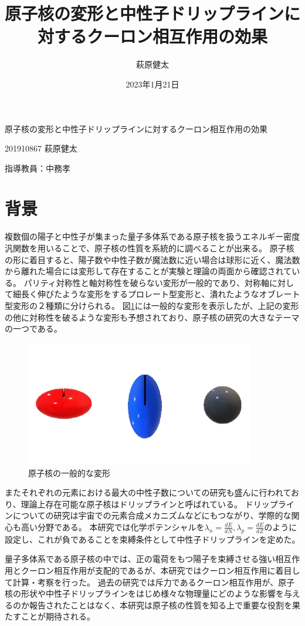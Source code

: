 \documentclass[12pt]{jarticle}
\title{原子核の変形と中性子ドリップラインに対するクーロン相互作用の効果}
\author{萩原健太}
\date{2023年1月21日}
\begin{document}
\begin{center}
    {\Large
        原子核の変形と中性子ドリップラインに対するクーロン相互作用の効果
    }
\end{center}
\vspace{1em}
\begin{flushright}
  201910867 萩原健太

  指導教員：中務孝
\end{flushright}


\section{背景}
複数個の陽子と中性子が集まった量子多体系である原子核を扱うエネルギー密度汎関数を用いることで、原子核の性質を系統的に調べることが出来る。
原子核の形に着目すると、陽子数や中性子数が魔法数に近い場合は球形に近く、魔法数から離れた場合には変形して存在することが実験と理論の両面から確認されている。
パリティ対称性と軸対称性を破らない変形が一般的であり、対称軸に対して細長く伸びたような変形をするプロレート型変形と、潰れたようなオブレート型変形の２種類に分けられる。
図\ref{fig:deformation}には一般的な変形を表示したが、上記の変形の他に対称性を破るような変形も予想されており、原子核の研究の大きなテーマの一つである。

\begin{figure}[H]
    \centering
    \includegraphics[width=100mm]{../変形図.png}
    \caption{原子核の一般的な変形}\label{fig:deformation}
\end{figure}

またそれぞれの元素における最大の中性子数についての研究も盛んに行われており、理論上存在可能な原子核はドリップラインと呼ばれている。
ドリップラインについての研究は宇宙での元素合成メカニズムなどにもつながり、学際的な関心も高い分野である。
本研究では化学ポテンシャルを$\lambda_n=\frac{dE}{dN}, \lambda_p=\frac{dE}{dZ}$のように設定し、これが負であることを束縛条件として中性子ドリップラインを定めた。

量子多体系である原子核の中では、正の電荷をもつ陽子を束縛させる強い相互作用とクーロン相互作用が支配的であるが、本研究ではクーロン相互作用に着目して計算・考察を行った。
過去の研究では斥力であるクーロン相互作用が、原子核の形状や中性子ドリップラインをはじめ様々な物理量にどのような影響を与えるのか報告されたことはなく、本研究は原子核の性質を知る上で重要な役割を果たすことが期待される。
\end{document}

